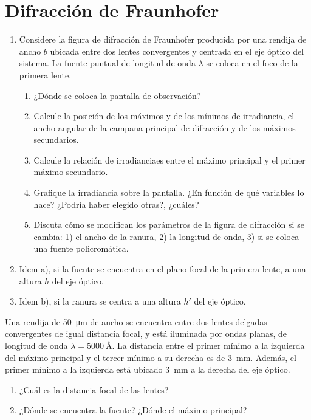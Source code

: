 \section*{Difracción de Fraunhofer}

\item
\begin{enumerate}
	\item Considere la figura de difracción de Fraunhofer producida por una rendija de ancho $b$ ubicada entre dos lentes convergentes y centrada en el eje óptico del sistema.
La fuente puntual de longitud de onda $\lambda$ se coloca en el foco de la primera lente. 
	\begin{enumerate}
		\item ¿Dónde se coloca la pantalla de observación?
		\item Calcule la posición de los máximos y de los mínimos de irradiancia, el ancho angular de la campana principal de difracción y de los máximos secundarios. 
		\item Calcule la relación de irradianciaes entre el máximo principal y el primer máximo secundario. 
		\item Grafique la irradiancia sobre la pantalla.
		¿En función de qué variables lo hace?
		¿Podría haber elegido otras?, ¿cuáles?
		\item Discuta cómo se modifican los parámetros de la figura de difracción si se cambia: 1) el ancho de la ranura, 2) la longitud de onda, 3) si se coloca una fuente policromática. 
	\end{enumerate}
	\item Idem a), si la fuente se encuentra en el plano focal de la primera lente, a una altura $h$ del eje óptico. 
	\item Idem b), si la ranura se centra a una altura $h'$ del eje óptico. 
\end{enumerate}



\item Una rendija de \SI{50}{\micro\metre} de ancho se encuentra entre dos lentes delgadas convergentes de igual distancia focal, y está iluminada por ondas planas, de longitud de onda $\lambda = \SI{5000}{\angstrom}$.
La distancia entre el primer mínimo a la izquierda del máximo principal y el tercer mínimo a su derecha es de \SI{3}{\milli\metre}.
Además, el primer mínimo a la izquierda está ubicado \SI{3}{\milli\metre} a la derecha del eje óptico.
\begin{enumerate}
	\item ¿Cuál es la distancia focal de las lentes? 
	\item ¿Dónde se encuentra la fuente?
	¿Dónde el máximo principal? 
\end{enumerate}



